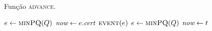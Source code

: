 \begin{algorithm}
    \caption[Algoritmo \textsc{advance} da árvore binária de busca]{Função \textsc{advance}.}
    \label{alg:abb:advance}
    \begin{algorithmic}[1]
                \State \Return
            \EndIf
            \State $e \leftarrow \Call{minPQ}{Q}$
                \State $\textit{now} \leftarrow e.\textit{cert}$
                \State $\Call{event}{e}$
                \State $e \leftarrow \Call{minPQ}{Q}$
            \EndWhile
            \State $\textit{now} \leftarrow t$
        \EndFunction
    \end{algorithmic}
\end{algorithm}